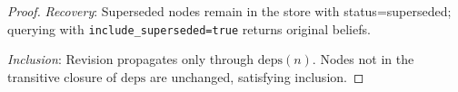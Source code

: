 \documentclass[11pt,letterpaper]{article}
\begin{document}
\begin{proof}
\textit{Recovery}: Superseded nodes remain in the store with status=superseded; querying with \texttt{include\_superseded=true} returns original beliefs.

\textit{Inclusion}: Revision propagates only through $\text{deps}(n)$. Nodes not in the transitive closure of $\text{deps}$ are unchanged, satisfying inclusion.
\end{proof}
\end{document}
